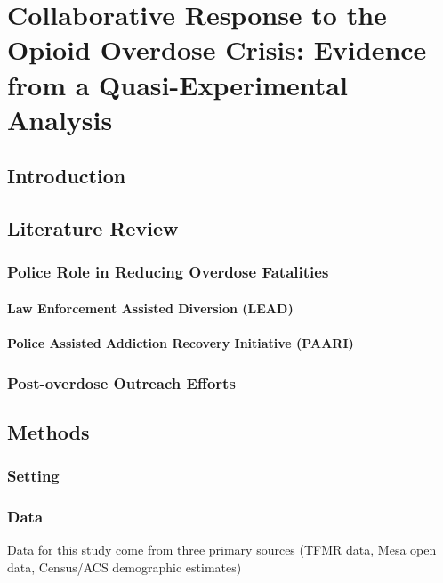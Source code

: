 \chapter{Collaborative Response to the Opioid Overdose Crisis: Evidence from a Quasi-Experimental Analysis}

\section{Introduction}


\section{Literature Review}

\subsection{Police Role in Reducing Overdose Fatalities}

\subsubsection{Law Enforcement Assisted Diversion (LEAD)}

\subsubsection{Police Assisted Addiction Recovery Initiative (PAARI)}

\subsection{Post-overdose Outreach Efforts}

\subsection{}
\section{Methods}
\subsection{Setting}

\subsection{Data}
Data for this study come from three primary sources (TFMR data, Mesa open data, Census/ACS demographic estimates)

